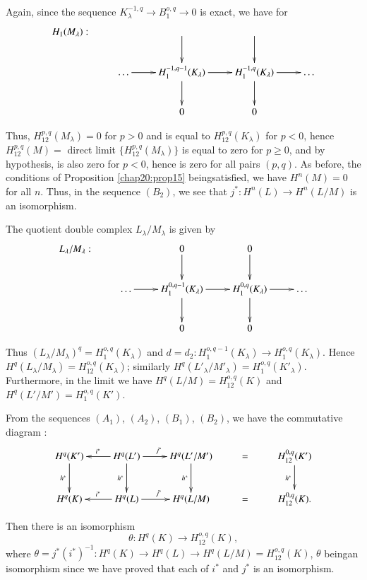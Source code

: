    Again, since the sequence $K^{-1,q}_\lambda \rightarrow B^{o,q}_1
   \rightarrow 0$ is exact, we have for 
\[
\xymatrix{
H_1(M_{\lambda}): &  & \ar[d] & \ar[d] & \\
& \ldots \ar[r] & H^{-1,q-1}_1 (K_{\lambda}) \ar[r] \ar[d]& H^{-1,q}_1
(K_{\lambda}) \ar[r] \ar[d]& \ldots\\
& & 0 & 0 & 
}
\]   

   Thus, $H^{p,q}_{12}(M_{\lambda}) = 0$ for $p > 0$ and is equal to
   $H^{p,q}_{12}(K_{\lambda})$ for $p <0$, hence $H^{p,q}_{12}(M) = $
   direct limit $\bigg\{ H^{p,q}_{12}(M_{\lambda}) \bigg\}$ is equal
   to zero for $p \ge 0$, and by hypothesis, is also zero for $p < 0$,
   hence is zero for all pairs $(p,q)$. As before, the conditions of
   Proposition \ref{chap20:prop15} being\pageoriginale satisfied, we
   have $H^n(M) = 0$ 
   for all $n$. Thus, in the sequence $(B_2)$, we see that $j^* :
   H^n(L) \rightarrow H^n (L/M)$ is an isomorphism.  
   
 The quotient double complex $L_{\lambda}/ M_{\lambda}$ is given by  
\[
\xymatrix{
L_{\lambda}/M_{\lambda}: &  & 0 \ar[d] & 0\ar[d] & \\
& \ldots \ar[r] & H^{0,q-1}_1 (K_{\lambda}) \ar[r] \ar[d]& H^{0,q}_1
(K_{\lambda}) \ar[r] \ar[d]& \ldots\\
& & 0 & 0 & 
}
\]   

 Thus $(L_{\lambda}/ M_{\lambda})^q = H^{o,q}_1 (K_{\lambda})$ and $d
 = d_2 :H^{o,q-1}_1 (K_{\lambda}) \rightarrow H^{o,q}_1
 (K_{\lambda})$. Hence $H^q(L_{\lambda}/M_{\lambda}) = H^{o,q}_{12}
 (K_{\lambda})$; similarly $H^q(L'_{\lambda}/ M'_{\lambda}) =
 H^{o,q}_1 (K'_{\lambda})$. Furthermore, in the limit we have
 $H^q(L/M) = H^{o,q}_{12} (K)$ and $H^q(L' /M') = H^{o,q}_1
 (K')$. 
 
 From the sequences $(A_1)$, $(A_2)$, $(B_1)$, $(B_2)$, we have the
 commutative diagram : 
\[
\xymatrix{
H^q(K')\ar[d]_{h^{\ast}} & H^q(L') \ar[l]_{i^{\ast}} \ar[r]^{j^{\ast}}
\ar[d]_{h^{\ast}} & H^q(L'/M') \ar[d]_{h^{\ast}} & = &
H^{0,q}_{12}(K')\ar[d]_{h^{\ast}} \\
H^q(K) & H^q(L) \ar[l]_{i^{\ast}} \ar[r]^{j^{\ast}} & H^q(L/M) & = &
H^{0,q}_{12} (K).
}
\]

 Then there is an isomorphism	
 $$
 \theta : H^q(K) \rightarrow H^{o,q}_{12} (K),  
 $$
 where $\theta = j^* (i^*)^{-1} : H^q (K) \rightarrow H^q(L)
 \rightarrow H^q(L/M) = H^{o,q}_{12} (K)$, $\theta $ \break
 being\pageoriginale an isomorphism since we have proved that each of
 $i^*$ and $j^*$ is an isomorphism. 
 
